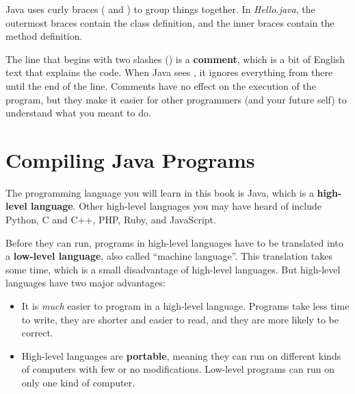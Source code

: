 Java uses curly braces (\java{\{} and \java{\}}) to group things together.
In {\it Hello.java}, the outermost braces contain the class definition, and the inner braces contain the method definition.


The line that begins with two slashes (\java{//}) is a {\bf comment}, which is a bit of English text that explains the code.
When Java sees \java{//}, it ignores everything from there until the end of the line.
Comments have no effect on the execution of the program, but they make it easier for other programmers (and your future self) to understand what you meant to do.


\section{Compiling Java Programs}


The programming language you will learn in this book is Java, which is a {\bf high-level language}.
Other high-level languages you may have heard of include Python, C and C++, PHP, Ruby, and JavaScript.


Before they can run, programs in high-level languages have to be translated into a {\bf low-level language}, also called ``machine language''.
This translation takes some time, which is a small disadvantage of high-level languages.
But high-level languages have two major advantages:

\begin{itemize}

\item It is {\em much} easier to program in a high-level language.
Programs take less time to write, they are shorter and easier to read, and they are more likely to be correct.


\item High-level languages are {\bf portable}, meaning they can run on different kinds of computers with few or no modifications.
Low-level programs can run on only one kind of computer. %

\end{itemize}


